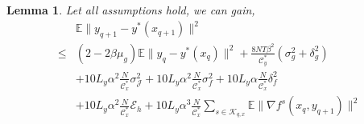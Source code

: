 \documentclass[lettersize,journal]{IEEEtran}
\newtheorem{lemma}{Lemma}
\begin{document}
\begin{lemma}
    Let all assumptions hold, we can gain,
    \begin{align}
    &\mathbb{E}\|y_{q+1}-y^*(x_{q+1})\|^2\\
    \leq&(2-2\beta\mu_g)\mathbb{E}\|y_{q}-y^*(x_q)\|^2+\frac{8NT\beta^2}{\mathcal{C}_y^*}(\sigma_{g}^2+\delta_{g}^2)\nonumber\\
    &+ 10L_y\alpha^2\frac{N}{\mathcal{C}_x^*}\sigma_{\mathcal{J}}^2+10L_y\alpha^2\frac{N}{\mathcal{C}_x^*}\sigma_f^2+10L_y\alpha\frac{N}{\mathcal{C}_x^*}\delta^2_f\nonumber\\
    &+10L_y\alpha^2\frac{N}{\mathcal{C}_x^*}\mathcal{E}_h+10L_y\alpha^3\frac{N}{\mathcal{C}_x^*}\sum_{s\in \mathcal{K}_{q,x}}\mathbb{E}\|\nabla f^s(x_{q},y_{q+1})\|^2\nonumber
    \end{align}
\end{lemma}
\end{document}
